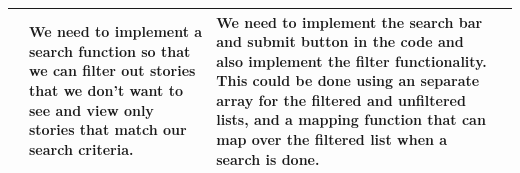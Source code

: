 \documentclass[onecolumn, draftclsnofoot,10pt, compsoc]{IEEEtran}
\begin{document}
\begin{table}[htbp]
\begin{tabularx}{1.05\textwidth}{| X | X | X | X |}
        &We need to implement a search function so that we can filter out stories that we don't want to see and view only stories that match our search criteria. &We need to implement the search bar and submit button in the code and also implement the filter functionality. This could be done using an separate array for the filtered and unfiltered lists, and a mapping function that can map over the filtered list when a search is done. \\ \hline
        
    \end{tabularx}
\end{table}
\end{document}
